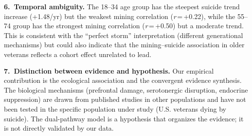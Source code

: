 \documentclass[11pt,twocolumn]{article}
\begin{document}
\textbf{6.~Temporal ambiguity.} The 18--34 age group has the steepest suicide trend increase (+1.48/yr) but the weakest mining correlation (\textit{r}\,=\,+0.22), while the 55--74 group has the strongest mining correlation (\textit{r}\,=\,+0.50) but a moderate trend. This is consistent with the ``perfect storm'' interpretation (different generational mechanisms) but could also indicate that the mining--suicide association in older veterans reflects a cohort effect unrelated to lead.

\textbf{7.~Distinction between evidence and hypothesis.} Our empirical contribution is the ecological association and the convergent evidence synthesis. The biological mechanisms (prefrontal damage, serotonergic disruption, endocrine suppression) are drawn from published studies in other populations and have not been tested in the specific population under study (U.S. veterans dying by suicide). The dual-pathway model is a hypothesis that organizes the evidence; it is not directly validated by our data.

\end{document}
